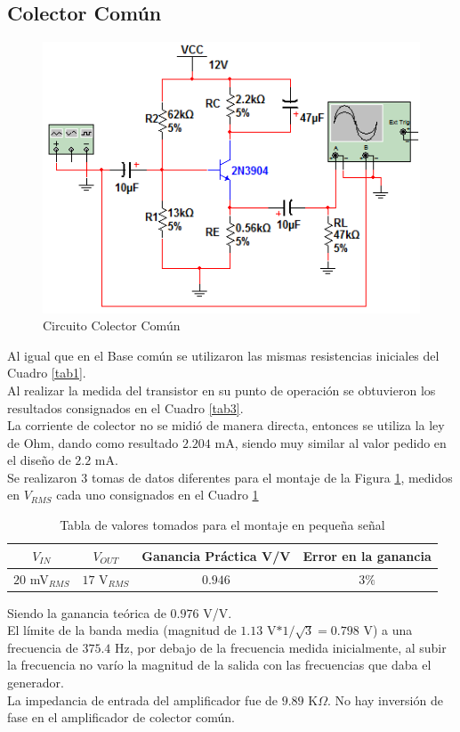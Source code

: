 \documentclass[10pt,graphicx,caption,rotating]{article}
\begin{document}
\subsection{Colector Común}
\begin{figure}[H]
	\centering
		\includegraphics[scale=0.7]{colector_comun.png}
	\caption{Circuito Colector Común}
	\label{fig3}
\end{figure}
\noindent
Al igual que en el Base común se utilizaron las mismas resistencias iniciales del Cuadro \ref{tab1}.\\
Al realizar la medida del transistor en su punto de operación se obtuvieron los resultados consignados en el Cuadro \ref{tab3}.\\
\noindent
La corriente de colector no se midió de manera directa, entonces se utiliza la ley de Ohm, dando como resultado $2.204$ mA, siendo muy similar al valor pedido en el diseño de $2.2$ mA.\\
Se realizaron 3 tomas de datos diferentes para el montaje de la Figura \ref{fig3}, medidos en $V_{RMS}$ cada uno consignados en el Cuadro \ref{tab9}
\begin{table}[H]
	\centering
\begin{tabular}[c]{|c|c|c|c|} \hline
$V_{IN}$ & $V_{OUT}$ & \textbf{Ganancia Práctica V/V} & \textbf{Error en la ganancia} \\ \hline
$20$ mV$_{RMS}$ & $17$ V$_{RMS}$ & $0.946$ & $3\%$ \\ \hline
\end{tabular}
	\caption{Tabla de valores tomados para el montaje en pequeña señal}
	\label{tab9}
\end{table}
\noindent
Siendo la ganancia teórica de $0.976$ V/V.\\
El límite de la banda media (magnitud de $1.13$ V$*1/ \sqrt{3}=0.798$ V)  a una frecuencia de $375.4$ Hz, por debajo de la frecuencia medida inicialmente, al subir la frecuencia no varío la magnitud de la salida con las frecuencias que daba el generador.\\
La impedancia de entrada del amplificador fue de $9.89$ K$\Omega$. No hay inversión de fase en el amplificador de colector común.
\end{document}
